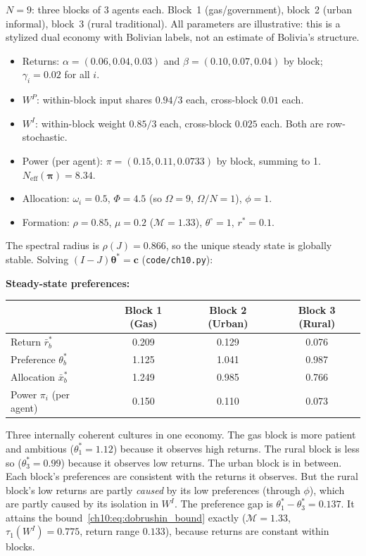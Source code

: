 \documentclass[../structural_economics_book.tex]{subfiles}
\begin{document}
\begin{example}\label{ch10:ex:bolivia_three}
$N = 9$: three blocks of 3 agents each. Block~1 (gas/government), block~2 (urban informal), block~3 (rural traditional). All parameters are illustrative: this is a stylized dual economy with Bolivian labels, not an estimate of Bolivia's structure.
\begin{itemize}
\item Returns: $\alpha = (0.06, 0.04, 0.03)$ and $\beta = (0.10, 0.07, 0.04)$ by block; $\gamma_i = 0.02$ for all $i$.
\item $W^P$: within-block input shares $0.94/3$ each, cross-block $0.01$ each.
\item $W^I$: within-block weight $0.85/3$ each, cross-block $0.025$ each. Both are row-stochastic.
\item Power (per agent): $\pi = (0.15, 0.11, 0.0733)$ by block, summing to 1. $N_{\text{eff}}(\boldsymbol{\pi}) = 8.34$.
\item Allocation: $\omega_i = 0.5$, $\Phi = 4.5$ (so $\Omega = 9$, $\Omega/N = 1$), $\phi = 1$.
\item Formation: $\rho = 0.85$, $\mu = 0.2$ ($\mathcal{M} = 1.33$), $\theta^{\circ} = 1$, $r^* = 0.1$.
\end{itemize}
The spectral radius is $\rho(J) = 0.866$, so the unique steady state is globally stable. Solving $(I - J)\boldsymbol{\theta}^* = \mathbf{c}$ (\texttt{code/ch10.py}):

\textbf{Steady-state preferences:}
\begin{center}
\begin{tabular}{lccc}
\toprule
& Block 1 (Gas) & Block 2 (Urban) & Block 3 (Rural) \\
\midrule
Return $\bar{r}_b^*$ & 0.209 & 0.129 & 0.076 \\
Preference $\theta_b^*$ & 1.125 & 1.041 & 0.987 \\
Allocation $\bar{x}_b^*$ & 1.249 & 0.985 & 0.766 \\
\midrule
Power $\pi_i$ (per agent) & 0.150 & 0.110 & 0.073 \\
\bottomrule
\end{tabular}
\end{center}

Three internally coherent cultures in one economy. The gas block is more patient and ambitious ($\theta_1^* = 1.12$) because it observes high returns. The rural block is less so ($\theta_3^* = 0.99$) because it observes low returns. The urban block is in between. Each block's preferences are consistent with the returns it observes. But the rural block's low returns are partly \textit{caused} by its low preferences (through $\phi$), which are partly caused by its isolation in $W^I$. The preference gap is $\theta_1^* - \theta_3^* = 0.137$. It attains the bound~\eqref{ch10:eq:dobrushin_bound} exactly ($\mathcal{M} = 1.33$, $\tau_1(W^I) = 0.775$, return range $0.133$), because returns are constant within blocks.


\end{example}
\end{document}
